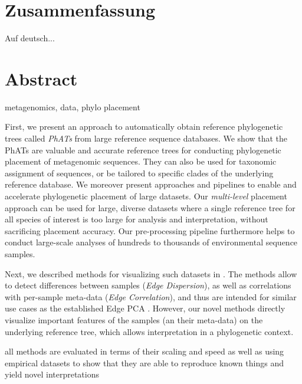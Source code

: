 \section*{Zusammenfassung}
\vspace*{1em}

Auf deutsch...

\blankpage

\section*{Abstract}
\vspace*{1em}

metagenomics, data, phylo placement

First, we present an approach to automatically obtain reference phylogenetic trees
called \emph{\acfp{PhAT}} from large reference sequence databases.
We show that the \acp{PhAT} are valuable and accurate reference trees
for conducting phylogenetic placement of metagenomic sequences.
They can also be used for taxonomic assignment of sequences,
or be tailored to specific clades of the underlying reference database.
We moreover present approaches and pipelines to enable and accelerate phylogenetic placement of large datasets.
Our \emph{multi-level} placement approach can be used for large, diverse datasets
where a single reference tree for all species of interest is too large for analysis and interpretation,
without sacrificing placement accuracy.
Our pre-processing pipeline furthermore helps to conduct large-scale analyses
of hundreds to thousands of environmental sequence samples.

Next, we described methods for visualizing such datasets in .
The methods allow to detect differences between samples (\emph{Edge Dispersion}),
as well as correlations with per-sample meta-data (\emph{Edge Correlation}),
and thus are intended for similar use cases as the established Edge PCA \cite{Matsen2011a}.
However, our novel methods directly visualize important features of the samples (an their meta-data)
on the underlying reference tree, which allows interpretation in a phylogenetic context.

all methods are evaluated in terms of their scaling and speed
as well as
using empirical datasets to show that they are able to reproduce known
things and yield novel interpretations

